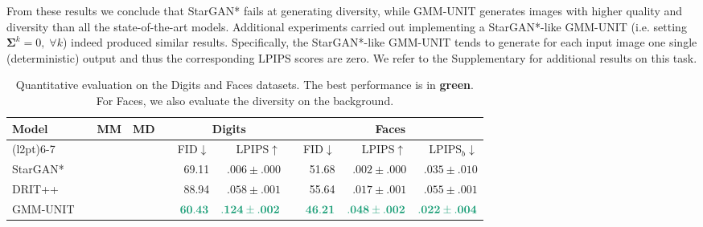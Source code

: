 \documentclass[runningheads]{llncs}
\newcommand{\bst}[1]{\textcolor[RGB]{27,158,119}{\mathbf{#1}}}
\newcommand{\bstt}[1]{\textcolor[RGB]{27,158,119}{\textbf{#1}}}
\begin{document}
From these results we conclude that StarGAN* fails at generating diversity, while GMM-UNIT generates images with higher quality and diversity than all the state-of-the-art models.
Additional experiments carried out implementing a StarGAN*-like GMM-UNIT (i.e. setting $\pmb{\Sigma}^k=0, \;\forall k$) indeed produced similar results. Specifically, the StarGAN*-like GMM-UNIT tends to generate for each input image one single (deterministic) output and thus the corresponding LPIPS scores are zero.
We refer to the Supplementary for additional results on this task.


\begin{table}[ht]
    \caption{Quantitative evaluation on the Digits and Faces datasets. The best performance is in \bstt{green}. For Faces, we also evaluate the diversity on the background.}
    \setlength{\tabcolsep}{2pt}
    \footnotesize
	\centering
	\begin{tabular}{@{}l c cc c rr c rrr@{}}
	\toprule
	\multirow{2}{*}{\textbf{Model}} & \phantom{i} & \multirow{2}{*}{\textbf{MM}} & \multirow{2}{*}{\textbf{MD}} & \phantom{i} & \multicolumn{2}{c}{\textbf{Digits}} & \phantom{i} & \multicolumn{3}{c}{\textbf{Faces}} 
	\\
	\cmidrule(l{2pt}){6-7} \cmidrule{9-11} 
	&&&&& FID$\downarrow$ & LPIPS$\uparrow$ && FID$\downarrow$ & LPIPS$\uparrow$ & LPIPS$_b$$\downarrow$ 
	\\
	\midrule
	StarGAN*~\cite{choi2018stargan} && & \checkmark && 69.11 & $.006\pm.000$ && 51.68 & $.002\pm .000$ &  $.035\pm .010$ \\
	DRIT++~\cite{lee2019drit++} && \checkmark & \checkmark && 88.94 & $.058\pm.001$ && 55.64 & $.017\pm.001$ & $.055\pm .001$\\
	GMM-UNIT && \checkmark & \checkmark && $\bst{60.43}$ & $\bst{.124\pm .002}$ && $\bst{46.21}$ & $\bst{.048 \pm .002}$  & $\bst{.022\pm .004}$ \\
	\bottomrule
	\end{tabular}
	\label{tab:QuantitativeResults_digits_ce}
\end{table}
\end{document}
